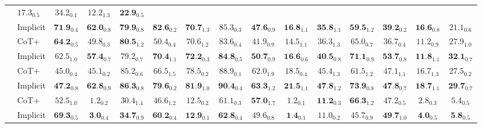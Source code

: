 \begin{table*}[t!]
{\begin{tabular}{llccccccccccccc}
& $17.3_{0.5}$ & $34.2_{0.1}$ & $12.2_{1.3}$ & $\textbf{22.9}_{0.5}$ \\
& Implicit
& $\textbf{71.9}_{0.4}$ & $\textbf{62.0}_{0.8}$ & $\textbf{79.9}_{0.8}$
& $\textbf{82.6}_{0.2}$ & $\textbf{70.7}_{1.3}$ & $85.3_{0.3}$
& $\textbf{47.6}_{0.9}$ & $\textbf{16.8}_{1.1}$ & $\textbf{35.8}_{1.1}$
& $\textbf{59.5}_{1.2}$ & $\textbf{39.2}_{0.2}$ & $\textbf{16.6}_{0.8}$ & $21.1_{0.6}$ \\
\cmidrule(lr){1-15}
& CoT+
& $\textbf{64.2}_{0.5}$ & $49.8_{0.3}$ & $\textbf{80.5}_{1.2}$
& $50.4_{0.4}$ & $70.6_{1.2}$ & $83.6_{0.4}$
& $41.9_{0.9}$ & $14.5_{1.1}$ & $36.3_{1.3}$
& $65.0_{0.7}$ & $36.7_{0.4}$ & $11.2_{0.9}$ & $27.9_{1.0}$ \\
& Implicit
& $62.5_{1.0}$ & $\textbf{57.4}_{0.7}$ & $79.2_{0.7}$
& $\textbf{70.4}_{1.1}$ & $\textbf{72.2}_{0.3}$ & $\textbf{84.8}_{0.5}$
& $\textbf{50.7}_{0.9}$ & $\textbf{16.6}_{0.6}$ & $\textbf{40.5}_{0.8}$
& $\textbf{71.1}_{0.9}$ & $\textbf{53.7}_{0.8}$ & $\textbf{11.8}_{1.1}$ & $\textbf{32.1}_{0.7}$ \\
\cmidrule(lr){1-15}
& CoT+
& $45.0_{0.4}$ & $45.1_{0.2}$ & $85.2_{0.6}$
& $66.5_{1.5}$ & $78.5_{0.2}$ & $88.9_{0.1}$
& $62.0_{1.9}$ & $18.5_{0.4}$ & $45.4_{1.3}$
& $61.5_{1.2}$ & ${47.1}_{1.1}$ & $16.7_{1.3}$ & ${27.5}_{0.2}$ \\
& Implicit
& $\textbf{47.2}_{0.8}$ & $\textbf{62.8}_{0.9}$ & $\textbf{86.3}_{0.8}$
& $\textbf{79.6}_{0.2}$ & $\textbf{81.9}_{1.0}$ & $\textbf{90.4}_{0.4}$
& $\textbf{63.3}_{1.2}$ & $\textbf{21.5}_{1.1}$ & $\textbf{47.8}_{1.2}$
& $\textbf{73.9}_{0.8}$ & $\textbf{47.8}_{0.7}$ & $\textbf{18.7}_{1.1}$ & $\textbf{29.7}_{0.7}$ \\
\cmidrule(lr){1-15}
& CoT+
& $52.5_{1.0}$ & $1.2_{0.2}$ & $30.4_{1.4}$
& $46.6_{1.2}$ & $12.5_{0.2}$ & $61.1_{0.3}$
& $\textbf{57.0}_{1.7}$ & $1.2_{0.1}$ & $\textbf{11.2}_{0.3}$
& $\textbf{66.3}_{1.2}$ & $47.2_{0.5}$ & $2.8_{0.3}$ & $5.4_{0.5}$ \\
& Implicit
& $\textbf{69.3}_{0.5}$ & $\textbf{3.0}_{0.4}$ & $\textbf{34.7}_{0.9}$
& $\textbf{60.2}_{0.4}$ & $\textbf{12.9}_{0.1}$ & $\textbf{62.8}_{0.4}$
& $49.6_{0.8}$ & $\textbf{1.4}_{0.1}$ & $11.0_{0.2}$
& $45.7_{0.9}$ & $\textbf{49.7}_{1.0}$ & $\textbf{4.0}_{0.5}$ & $\textbf{5.8}_{0.5}$ \\

\end{tabular}}
\end{table*}
